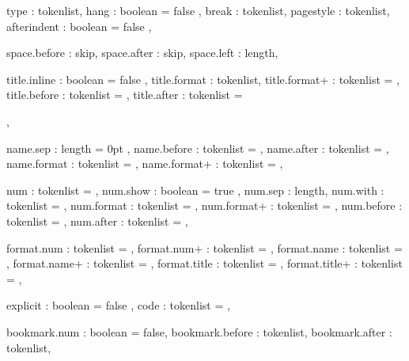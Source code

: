   {
    type            : tokenlist,
    hang            : boolean   = { false },
    break           : tokenlist,
    pagestyle       : tokenlist,
    afterindent     : boolean   = { false },

    space.before    : skip,
    space.after     : skip,
    space.left      : length,

    title.inline    : boolean    = { false }, 
    title.format    : tokenlist,
    title.format+   : tokenlist  = { },
    title.before    : tokenlist  = { },
    title.after     : tokenlist  = { \par },

    name.sep        : length     = { 0pt },
    name.before     : tokenlist  = { },
    name.after      : tokenlist  = { },
    name.format     : tokenlist  = { },
    name.format+    : tokenlist  = { },

    num             : tokenlist  = { },
    num.show        : boolean    = { true },
    num.sep         : length,
    num.with        : tokenlist  = { },
    num.format      : tokenlist  = { },
    num.format+     : tokenlist  = { },
    num.before      : tokenlist  = { },
    num.after       : tokenlist  = { },

    format.num      : tokenlist  = ,
    format.num+     : tokenlist  = ,
    format.name     : tokenlist  = ,
    format.name+    : tokenlist  = ,
    format.title    : tokenlist  = ,
    format.title+   : tokenlist  = ,

    explicit        : boolean    = { false },
    code            : tokenlist  = { },

    bookmark.num    : boolean    = false,
    bookmark.before : tokenlist,
    bookmark.after  : tokenlist,
  }
